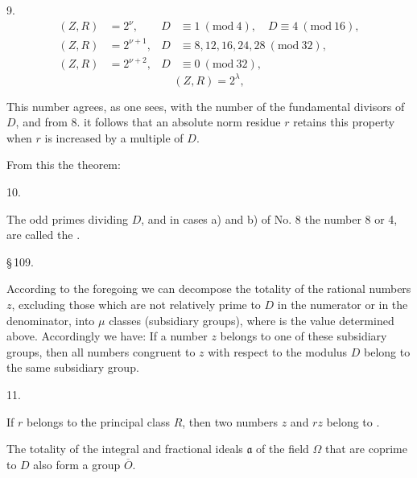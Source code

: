 9. 
\[
\begin{aligned}
(Z, R) &= 2^{\nu}, & D &\equiv 1 \ (\mathrm{mod}\ 4), \quad D \equiv 4 \ (\mathrm{mod}\ 16),\\
(Z, R) &= 2^{\nu+1}, & D &\equiv 8, 12, 16, 24, 28 \ (\mathrm{mod}\ 32),\\
(Z, R) &= 2^{\nu+2}, & D &\equiv 0 \ (\mathrm{mod}\ 32),
\end{aligned}
\]
\[
(Z, R) = 2^{\lambda},
\]

This number agrees, as one sees, with the number of the fundamental divisors of $D$, and from 8. it follows that an absolute norm residue $r$ retains this property when $r$ is increased by a multiple of $D$.

From this the theorem:

10. 

The odd primes dividing $D$, and in cases a) and b) of No. 8 the number 8 or 4, are called the .

\begin{center}
\S\,109. 
\end{center}

According to the foregoing we can decompose the totality of the rational numbers $z$, excluding those which are not relatively prime to $D$ in the numerator or in the denominator, into $\mu$ classes (subsidiary groups), where
is the value determined above. Accordingly we have:
If a number $z$ belongs to one of these subsidiary groups, then all numbers congruent to $z$ with respect to the modulus $D$ belong to the same subsidiary group.

11. 

If $r$ belongs to the principal class $R$, then two numbers $z$ and $rz$ belong to .

The totality of the integral and fractional ideals $\mathfrak{a}$ of the field $\Omega$ that are coprime to $D$ also form a group $\overline{O}$.

